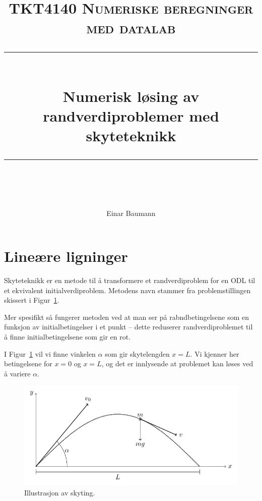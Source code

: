 



\usepackage{etex}
\usepackage{tikz,pgfplots}
\pgfplotsset{compat=1.9}
\usetikzlibrary{arrows,decorations.markings}


\author{Einar Baumann}
\title{
    \vspace{-1in}
    \normalfont \normalsize \textsc{TKT4140 Numeriske beregninger med datalab} \\ [20pt]
    \vspace{0.1in}
    \rule{\textwidth}{0.5pt} \\[1cm]
    {\sffamily \huge Numerisk løsing av randverdiproblemer med skyteteknikk} \\
    \vspace{0.1in}
    \rule{\textwidth}{2pt} \\[0.7cm]
}


\maketitle
\thispagestyle{empty}
\clearpage

\section{Lineære ligninger} %
\label{sec:line_re_ligninger}
Skyteteknikk er en metode til å transformere et randverdiproblem for en ODL til et ekvivalent initialverdiproblem\cite{komp}. Metodens navn stammer fra problemstillingen skissert i Figur~\ref{fig:skyting}.

Mer spesifikt så fungerer metoden ved at man ser på rabndbetingelsene som en funksjon av initialbetingelser i et punkt -- dette reduserer randverdiproblemet til å finne initialbetingelsene som gir en rot.

I Figur~\ref{fig:skyting} vil vi finne vinkelen $\alpha$ som gir skytelengden $x=L$. Vi kjenner her betingelsene for $x=0$ og $x=L$, og det er innlysende at problemet kan løses ved å variere $\alpha$.

\begin{figure}[htbp]
  \centering
  \includegraphics[]{illustrations/shooting.pdf}
  \caption{Illustrasjon av skyting.}
  \label{fig:skyting}
\end{figure}




